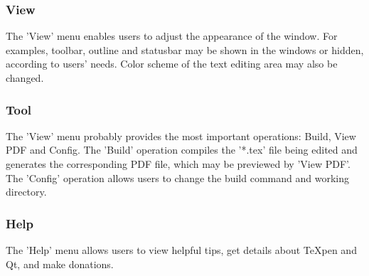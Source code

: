 \documentclass[12pt,a4paper]{article}
\begin{document}
\subsubsection{View}
The 'View' menu enables users to adjust the appearance of the window. For examples, toolbar, outline and statusbar may be shown in the windows or hidden, according to users' needs. Color scheme of the text editing area may also be changed.

\subsubsection{Tool}
The 'View' menu probably provides the most important operations: Build, View PDF and Config. The 'Build' operation compiles the '*.tex' file being edited and generates the corresponding PDF file, which may be previewed by 'View PDF'. The 'Config' operation allows users to change the build command and working directory.

\subsubsection{Help}
The 'Help' menu allows users to view helpful tips, get details about {\TeX}pen and Qt, and make donations.


\clearpage
{}
{} %
%
\end{document}
